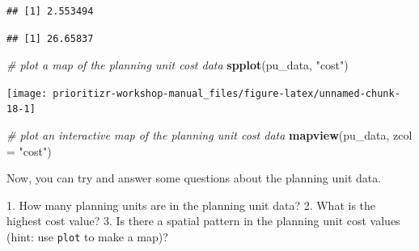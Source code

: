 \documentclass[12pt,]{book}
\makeatletter
\newenvironment{Shaded}{\begin{snugshade}}{\end{snugshade}}
\newcommand{\KeywordTok}[1]{\textcolor[rgb]{0.13,0.29,0.53}{\textbf{#1}}}
\newcommand{\DataTypeTok}[1]{\textcolor[rgb]{0.13,0.29,0.53}{#1}}
\newcommand{\StringTok}[1]{\textcolor[rgb]{0.31,0.60,0.02}{#1}}
\newcommand{\CommentTok}[1]{\textcolor[rgb]{0.56,0.35,0.01}{\textit{#1}}}
\newcommand{\OperatorTok}[1]{\textcolor[rgb]{0.81,0.36,0.00}{\textbf{#1}}}
\newcommand{\NormalTok}[1]{#1}
\newenvironment{kframe}{%
\medskip{}
\setlength{\fboxsep}{.8em}
 \def\at@end@of@kframe{}%
 \ifinner\ifhmode%
  \def\at@end@of@kframe{\end{minipage}}%
  \begin{minipage}{\columnwidth}%
 \fi\fi%
 \def\FrameCommand##1{\hskip\@totalleftmargin \hskip-\fboxsep
 \colorbox{shadecolor}{##1}\hskip-\fboxsep
     \hskip-\linewidth \hskip-\@totalleftmargin \hskip\columnwidth}%
 \MakeFramed {\advance\hsize-\width
   \@totalleftmargin\z@ \linewidth\hsize
   \@setminipage}}%
 {\par\unskip\endMakeFramed%
 \at@end@of@kframe}
\newenvironment{rmdblock}[1]
  {
  \begin{itemize}
  \renewcommand{\labelitemi}{
    \raisebox{-.7\height}[0pt][0pt]{
      {\setkeys{Gin}{width=3em,keepaspectratio}\texttt{[image: images/\#1]}}
    }
  }
  \setlength{\fboxsep}{1em}
  \begin{kframe}
  \item
  }
  {
  \end{kframe}
  \end{itemize}
  }
\newenvironment{rmdquestion}
  {\begin{rmdblock}{question}}
  {\end{rmdblock}}
\makeatother
\begin{document}
\begin{Shaded}
\end{Shaded}

\begin{verbatim}
## [1] 2.553494
\end{verbatim}

\begin{Shaded}
\end{Shaded}

\begin{verbatim}
## [1] 26.65837
\end{verbatim}

\begin{Shaded}
\begin{Highlighting}[]
\CommentTok{# plot a map of the planning unit cost data}
\KeywordTok{spplot}\NormalTok{(pu_data, }\StringTok{"cost"}\NormalTok{)}
\end{Highlighting}
\end{Shaded}

\begin{center}\texttt{[image: prioritizr-workshop-manual\_files/figure-latex/unnamed-chunk-18-1]} \end{center}

\begin{Shaded}
\begin{Highlighting}[]
\CommentTok{# plot an interactive map of the planning unit cost data}
\KeywordTok{mapview}\NormalTok{(pu_data, }\DataTypeTok{zcol =} \StringTok{"cost"}\NormalTok{)}
\end{Highlighting}
\end{Shaded}

Now, you can try and answer some questions about the planning unit data.

\begin{rmdquestion} 1. How many planning units are in the
planning unit data? 2. What is the highest cost value? 3. Is there a
spatial pattern in the planning unit cost values (hint: use
\texttt{plot} to make a map)?
\end{rmdquestion}
\end{document}
